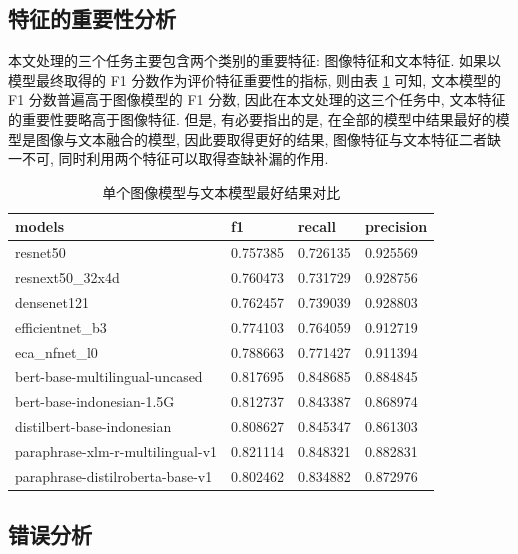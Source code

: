 \documentclass[12pt]{article}
\begin{document}
\subsection{特征的重要性分析}

本文处理的三个任务主要包含两个类别的重要特征: 图像特征和文本特征. 如果以模型最终取得的 F1 分数作为评价特征重要性的指标, 则由表 \ref{tab:image_text_best_results_analysis} 可知, 文本模型的 F1 分数普遍高于图像模型的 F1 分数, 因此在本文处理的这三个任务中, 文本特征的重要性要略高于图像特征. 但是, 有必要指出的是, 在全部的模型中结果最好的模型是图像与文本融合的模型, 因此要取得更好的结果, 图像特征与文本特征二者缺一不可, 同时利用两个特征可以取得查缺补漏的作用.

\begin{table}[htbp]
  \centering
  \caption{单个图像模型与文本模型最好结果对比}
  \label{tab:image_text_best_results_analysis}
  \begin{tabular}{llll}
    \toprule
    models                           & f1       & recall   & precision \\
    \midrule                 
    resnet50                         & 0.757385 & 0.726135 & 0.925569  \\
    resnext50\_32x4d                 & 0.760473 & 0.731729 & 0.928756  \\
    densenet121                      & 0.762457 & 0.739039 & 0.928803  \\
    efficientnet\_b3                 & 0.774103 & 0.764059 & 0.912719  \\
    eca\_nfnet\_l0                   & 0.788663 & 0.771427 & 0.911394 \\
    bert-base-multilingual-uncased   & 0.817695 & 0.848685 & 0.884845  \\
    bert-base-indonesian-1.5G        & 0.812737 & 0.843387 & 0.868974  \\
    distilbert-base-indonesian       & 0.808627 & 0.845347 & 0.861303  \\
    paraphrase-xlm-r-multilingual-v1 & 0.821114 & 0.848321 & 0.882831  \\
    paraphrase-distilroberta-base-v1 & 0.802462 & 0.834882 & 0.872976 \\
    \bottomrule
  \end{tabular}
\end{table}

\subsection{错误分析}
\end{document}
